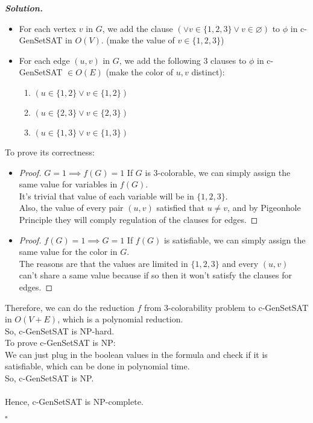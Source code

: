 \documentclass[12pt, a4paper, UTF8]{article}
\newenvironment{solution}[1][\it{Solution}]{\textbf{#1. }\\}{\begin{flushright}$\square$\end{flushright}}
\begin{document}
\begin{subprobs}
\begin{subprobs}
\begin{solution}
        \begin{itemize}
            \item For each vertex $v$ in $G$, we add the clause $(\vee v \in \{1, 2, 3\} \vee v \in \varnothing)$ to $\phi$ in c-GenSetSAT in $O(V)$. (make the value of $v \in \{1, 2, 3\}$)
            \item For each edge $(u, v)$ in $G$, we add the following 3 clauses to $\phi$ in c-GenSetSAT $\in O(E)$ (make the color of $u, v$ distinct):
                \begin{enumerate}
                    \item $(u \in \{1, 2\} \vee v \in \{1, 2\})$
                    \item $(u \in \{2, 3\} \vee v \in \{2, 3\})$
                    \item $(u \in \{1, 3\} \vee v \in \{1, 3\})$
                \end{enumerate}
        \end{itemize}
        To prove its correctness:
        \begin{itemize}
            \item
                \begin{proof} $G = 1 \implies f(G) = 1$ 
                    If $G$ is 3-colorable, we can simply assign the same value for variables in $f(G)$.\\
                    It's trivial that value of each variable will be in $\{1, 2, 3\}$.\\
                    Also, the value of every pair $(u, v)$ satisfied that $u \neq v$, and by Pigeonhole Principle they will comply regulation of the clauses for edges.
                \end{proof}
            \item
                \begin{proof} $f(G) = 1 \implies G = 1$
                    If $f(G)$ is satisfiable, we can simply assign the same value for the color in $G$.\\
                    The reasons are that the values are limited in $\{1, 2, 3\}$ and every $(u, v)$ can't share a same value because if so then it won't satisfy the clauses for edges.
                \end{proof}
        \end{itemize}
        Therefore, we can do the reduction $f$ from 3-colorability problem to c-GenSetSAT in $O(V + E)$, which is a polynomial reduction.\\
        So, c-GenSetSAT is NP-hard.\\ 
        To prove c-GenSetSAT is NP:\\
        We can just plug in the boolean values in the formula and check if it is satisfiable, which can be done in polynomial time.\\
        So, c-GenSetSAT is NP.\\
        \\
        Hence, c-GenSetSAT is NP-complete.
    \end{solution}
\end{subprobs}
\end{subprobs}
\end{document}
